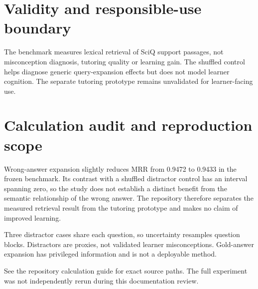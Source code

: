 \documentclass[11pt]{article}
\begin{document}


\section{Validity and responsible-use boundary}
The benchmark measures lexical retrieval of SciQ support passages, not misconception diagnosis, tutoring quality or learning gain. The shuffled control helps diagnose generic query-expansion effects but does not model learner cognition. The separate tutoring prototype remains unvalidated for learner-facing use.



\section{Calculation audit and reproduction scope}
Wrong-answer expansion slightly reduces MRR from 0.9472 to 0.9433 in the frozen benchmark. Its contrast with a shuffled distractor control has an interval spanning zero, so the study does not establish a distinct benefit from the semantic relationship of the wrong answer. The repository therefore separates the measured retrieval result from the tutoring prototype and makes no claim of improved learning.

Three distractor cases share each question, so uncertainty resamples question blocks. Distractors are proxies, not validated learner misconceptions. Gold-answer expansion has privileged information and is not a deployable method.

See the repository calculation guide for exact source paths. The full experiment was not independently rerun during this documentation review.
\end{document}
